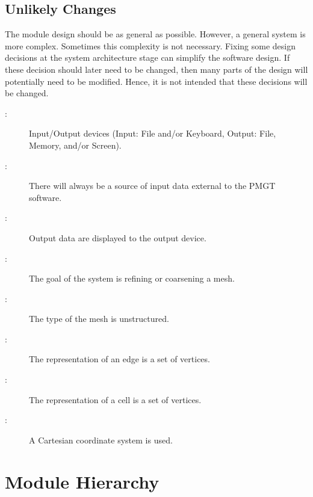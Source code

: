 \documentclass[12pt,titlepage]{article}
\begin{document}
\subsection{Unlikely Changes \label{AmgSecUchange}}
The module design should be as general as possible. However, a general system is more complex. Sometimes this complexity is not necessary. Fixing some design decisions at the system architecture stage can simplify the software design. If these decision should later need to be changed, then many parts of the design will potentially need to be modified. Hence, it is not intended that these decisions will be changed. 
\begin{description}
\item[ \uctheucnum \label{ucIO}:] Input/Output devices (Input: File and/or Keyboard, Output: File, Memory, and/or Screen). 
\item[ \uctheucnum \label{ucInput}:] There will always be a source of input data external to the PMGT software.
\item[ \uctheucnum \label{ucOutput}:] Output data are displayed to the output device.
\item[ \uctheucnum \label{ucGoal}:] The goal of the system is refining or coarsening a mesh.
\item[ \uctheucnum \label{ucMeshType}:] The type of the mesh is unstructured.
\item[ \uctheucnum \label{ucEdge}:] The representation of an edge is a set of vertices.
\item[ \uctheucnum \label{ucCell}:] The representation of a cell is a set of vertices.
\item[ \uctheucnum \label{ucCoordinate}:] A Cartesian coordinate system is used.
\end{description}

\section{Module Hierarchy \label{AmgSecMH}}
\end{document}
